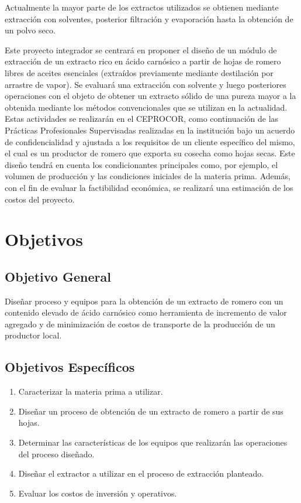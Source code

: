 \documentclass[11pt,a4paper]{article}
\begin{document}
Actualmente la mayor parte de los extractos utilizados se obtienen mediante extracción con solventes, posterior filtración y evaporación hasta la obtención de un polvo seco.

Este proyecto integrador se centrará en proponer el diseño de un módulo de extracción de un extracto rico en ácido carnósico a partir de hojas de romero libres de aceites esenciales (extraídos previamente mediante destilación por arrastre de vapor).
Se evaluará una extracción con solvente y luego posteriores operaciones con el objeto de obtener un extracto sólido de una pureza mayor a la obtenida mediante los métodos convencionales que se utilizan en la actualidad.
Estas actividades se realizarán en el \ac{CEPROCOR}, como continuación de las Prácticas Profesionales Supervisadas realizadas en la institución bajo un acuerdo de confidencialidad y ajustada a los requisitos de un cliente específico del mismo, el cual es un productor de romero que exporta su cosecha como hojas secas.
Este diseño tendrá en cuenta los condicionantes principales como, por ejemplo, el volumen de producción y las condiciones iniciales de la materia prima.
Además, con el fin de evaluar la factibilidad económica, se realizará una estimación de los costos del proyecto.

\section{Objetivos}

\subsection{Objetivo General}

Diseñar proceso y equipos para la obtención de un extracto de romero con un contenido elevado de ácido carnósico como herramienta de incremento de valor agregado y de minimización de costos de transporte de la producción de un productor local.

\subsection{Objetivos Específicos}

\begin{enumerate}
	\item{Caracterizar la materia prima a utilizar.}
	\item{Diseñar un proceso de obtención de un extracto de romero a partir de sus hojas.}
	\item{Determinar las características de los equipos que realizarán las operaciones del proceso diseñado.}
	\item{Diseñar el extractor a utilizar en el proceso de extracción planteado.}
	\item{Evaluar los costos de inversión y operativos.}
\end{enumerate}
\end{document}
